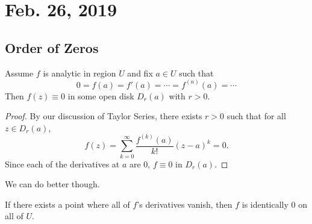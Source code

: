 \documentclass[notes]{subfile}
\begin{document}
\section{Feb. 26, 2019}

\subsection{Order of Zeros}

\begin{theorem}
    Assume $f$ is analytic in region $U$ and fix $a \in U$ such that
    \[ 0 = f(a) = f'(a) = \cdots = f^{(n)}(a) = \cdots \]
    Then $f(z) \equiv 0$ in some open disk $D_r(a)$ with
    $r > 0$.
\end{theorem}

\begin{proof}
    By our discussion of Taylor Series, there exists $r > 0$
    such that for all $z \in D_r(a)$,
    \[ f(z) = \sum_{k=0}^{\infty} \frac{f^{(k)}(a)}{k!}(z-a)^k
    = 0. \]
    Since each of the derivatives at $a$ are $0$, $f \equiv 0$ 
    in $D_r(a)$.
\end{proof}

We can do better though.

\begin{theorem}
    If there exists a point where all of $f$'s derivatives 
    vanish, then $f$ is identically $0$ on all of $U$.
\end{theorem}
\end{document}
